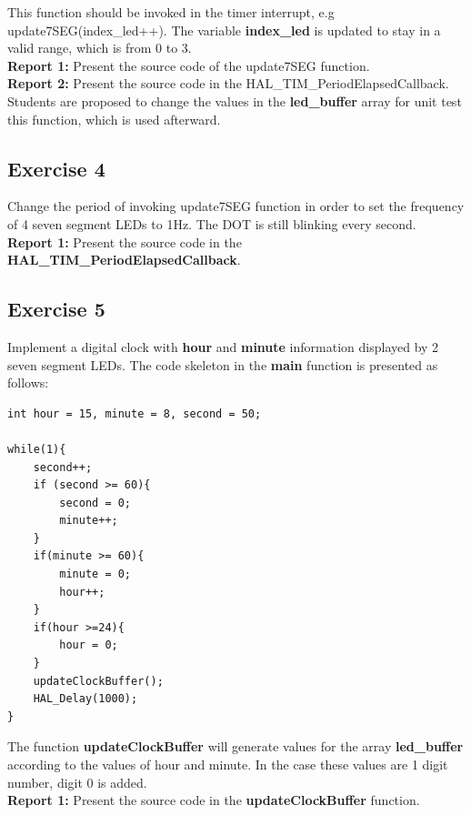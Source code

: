 This function should be invoked in the timer interrupt, e.g update7SEG(index\_led++). The variable \textbf{index\_led} is updated to stay in a valid range, which is from 0 to 3. \\

\textbf{Report 1: } Present the source code of the update7SEG function. \\

\textbf{Report 2: } Present the source code in the HAL\_TIM\_PeriodElapsedCallback.\\

Students are proposed to change the values in the \textbf{led\_buffer} array for unit test this function, which is used afterward.

\subsection{Exercise 4}
Change the period of invoking update7SEG function in order to set the frequency of 4 seven segment LEDs to 1Hz. The DOT is still blinking every second.\\


\textbf{Report 1: } Present the source code in the \textbf{HAL\_TIM\_PeriodElapsedCallback}. \\

\subsection{Exercise 5}
Implement a digital clock with \textbf{hour} and \textbf {minute} information displayed by 2 seven segment LEDs. The code skeleton in the \textbf{main} function is presented as follows:
\begin{lstlisting}[caption=An example for your source code]
int hour = 15, minute = 8, second = 50;

while(1){
    second++;
    if (second >= 60){
        second = 0;
        minute++;
    }
    if(minute >= 60){
        minute = 0;
        hour++;
    }
    if(hour >=24){
        hour = 0;
    }
    updateClockBuffer();
    HAL_Delay(1000);
}
\end{lstlisting}

The function \textbf{updateClockBuffer} will generate values for the array \textbf{led\_buffer} according to the values of hour and minute. In the case these values are 1 digit number, digit 0 is added. \\

\textbf{Report 1: } Present the source code in the \textbf{updateClockBuffer} function.

